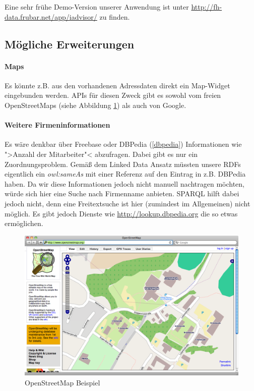 Eine sehr frühe Demo-Version unserer Anwendung ist unter \url{http://fh-data.frubar.net/app/iadvisor/} zu finden.

\subsection{Mögliche Erweiterungen}

\paragraph{Maps} Es könnte z.B. aus den vorhandenen Adressdaten direkt ein Map-Widget eingebunden werden. APIs für diesen Zweck gibt es sowohl vom freien OpenStreetMaps (siehe Abbildung \ref{osm-screenshot}) als auch von Google.

\paragraph{Weitere Firmeninformationen} Es wäre denkbar über Freebase oder DBPedia (\ref{dbpedia}) Informationen wie ">Anzahl der Mitarbeiter"< abzufragen. Dabei gibt es nur ein Zuordnungsproblem. Gemäß dem Linked Data Ansatz müssten unsere RDFs eigentlich ein \textit{owl:sameAs} mit einer Referenz auf den Eintrag in z.B. DBPedia haben. Da wir diese Informationen jedoch nicht manuell nachtragen möchten, würde sich hier eine Suche nach Firmenname anbieten. SPARQL hilft dabei jedoch nicht, denn eine Freitextsuche ist hier (zumindest im Allgemeinen) nicht möglich. Es gibt jedoch Dienste wie \href{lookup.dbpedia.org}{http://lookup.dbpedia.org} die so etwas ermöglichen.

\begin{figure}[htbp]
	\centering
	\includegraphics[scale=0.39]{images/osm-shot.png}
	\caption{OpenStreetMap Beispiel}
	\label{osm-screenshot}
\end{figure}


